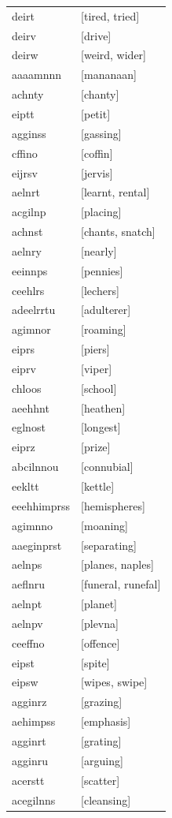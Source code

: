 \documentclass{article}
\begin{document}
\begin{tabular}{ll}
deirt & [tired, tried] \\
deirv & [drive] \\
deirw & [weird, wider] \\
aaaamnnn & [mananaan] \\
achnty & [chanty] \\
eiptt & [petit] \\
agginss & [gassing] \\
cffino & [coffin] \\
eijrsv & [jervis] \\
aelnrt & [learnt, rental] \\
acgilnp & [placing] \\
achnst & [chants, snatch] \\
aelnry & [nearly] \\
eeinnps & [pennies] \\
ceehlrs & [lechers] \\
adeelrrtu & [adulterer] \\
agimnor & [roaming] \\
eiprs & [piers] \\
eiprv & [viper] \\
chloos & [school] \\
aeehhnt & [heathen] \\
eglnost & [longest] \\
eiprz & [prize] \\
abcilnnou & [connubial] \\
eekltt & [kettle] \\
eeehhimprss & [hemispheres] \\
agimnno & [moaning] \\
aaeginprst & [separating] \\
aelnps & [planes, naples] \\
aeflnru & [funeral, runefal] \\
aelnpt & [planet] \\
aelnpv & [plevna] \\
ceeffno & [offence] \\
eipst & [spite] \\
eipsw & [wipes, swipe] \\
agginrz & [grazing] \\
aehimpss & [emphasis] \\
agginrt & [grating] \\
agginru & [arguing] \\
acerstt & [scatter] \\
acegilnns & [cleansing] \\

\end{tabular}
\end{document}
